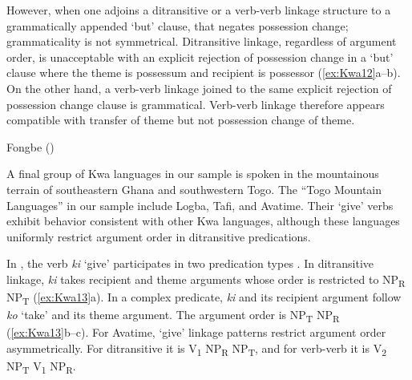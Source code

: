\documentclass[output=paper,colorlinks,citecolor=brown]{langscibook}
\begin{document}
However, when one adjoins a ditransitive or a verb-verb linkage structure to a grammatically appended ‘but’ clause, that negates possession change; grammaticality is not symmetrical. Ditransitive linkage, regardless of argument order, is unacceptable with an explicit rejection of possession change in a ‘but’ clause where the theme is possessum and recipient is possessor (\ref{ex:Kwa12}a--b). On the other hand, a verb-verb linkage joined to the same explicit rejection of possession change clause is grammatical. Verb-verb linkage therefore appears compatible with transfer of theme but not possession change of theme.

\ea \label{ex:Kwa12} Fongbe (\citealt[473]{Lefebvre_Brousseau2002})
\begin{xlist}
\end{xlist}
\z

A final group of Kwa languages in our sample is spoken in the mountainous terrain of southeastern Ghana and southwestern Togo. The ``Togo Mountain Languages''  in our sample include Logba, Tafi, and Avatime. Their ‘give’ verbs exhibit behavior consistent with other Kwa languages, although these languages uniformly restrict argument order in ditransitive predications.

In , the verb \textit{ki} ‘give’ participates in two predication types \citep{Defina2016}. In ditransitive linkage, \textit{ki} takes recipient and theme arguments whose order is restricted to NP\textsubscript{R} NP\textsubscript{T} (\ref{ex:Kwa13}a). In a complex predicate, \textit{ki} and its recipient argument follow \textit{ko} ‘take’ and its theme argument. The argument order is NP\textsubscript{T} NP\textsubscript{R} (\ref{ex:Kwa13}b--c). For Avatime, ‘give’ linkage patterns restrict argument order asymmetrically. For ditransitive it is V\textsubscript{1} NP\textsubscript{R} NP\textsubscript{T}, and for verb-verb it is V\textsubscript{2} NP\textsubscript{T} V\textsubscript{1} NP\textsubscript{R}.\largerpage
\end{document}
